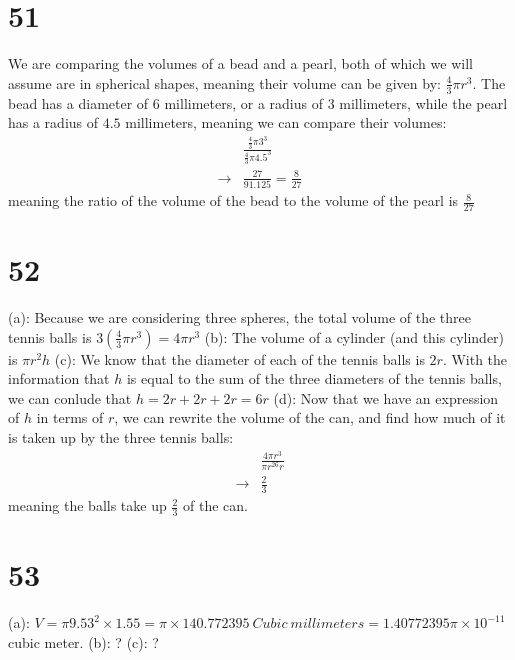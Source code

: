 \documentclass{article}
\theoremstyle{definition}
\begin{document}
\section*{51}
We are comparing the volumes of a bead and a pearl, both of which we will assume are in spherical shapes, meaning their volume can be given by: 
$\frac{4}{3}\pi r^3$. The bead has a diameter of $6$ millimeters, or a radius of $3$ millimeters, while the pearl has a radius of $4.5$ millimeters, 
meaning we can compare their volumes:
\[
\begin{array}{rl}
            & \frac{\frac{4}{3}\pi 3^3}{\frac{4}{3}\pi 4.5^3} \\
\rightarrow & \frac{27}{91.125}=\frac{8}{27} 
\end{array}
\]
meaning the ratio of the volume of the bead to the volume of the pearl is $\frac{8}{27}$

\section*{52}
(a): Because we are considering three spheres, the total volume of the three tennis balls is $3(\frac{4}{3}\pi r^3)=4\pi r^3$\newline
(b): The volume of a cylinder (and this cylinder) is $\pi r^2h$\newline
(c): We know that the diameter of each of the tennis balls is $2r$. With the information that $h$ is equal to the sum of the three diameters of the tennis 
balls, we can conlude that $h=2r+2r+2r=6r$\newline
(d): Now that we have an expression of $h$ in terms of $r$, we can rewrite the volume of the can, and find how much of it is taken up by the three 
tennis balls:
\[
\begin{array}{rl}
            & \frac{4\pi r^3}{\pi r^26r} \\
\rightarrow & \frac{2}{3} 
\end{array}
\]
meaning the balls take up $\frac{2}{3}$ of the can.

\section*{53}
(a): $V=\pi 9.53^2\times 1.55=\pi \times 140.772395\ Cubic\ millimeters=1.40772395\pi \times 10^{-11}$ cubic meter.\newline
(b): ?\newline
(c): ?
\end{document}
